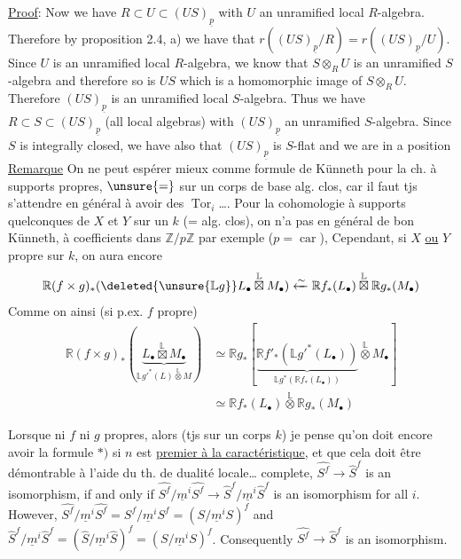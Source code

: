\uline{Proof}: Now we have $R\subset U\subset(US)_{\underline p}$ with $U$ an unramified local $R$-algebra.
Therefore by proposition 2.4, a) we have that $r((US)_{\underline p}/R)=r((US)_{\underline p}/U)$. Since
$U$ is an unramified local $R$-algebra, we know that $S\otimes_R U$ is an unramified
$S$-algebra and therefore so is $US$ which is a homomorphic image of $S\otimes_R U$.
Therefore $(US)_{\underline p}$ is an unramified local $S$-algebra. Thus we have $R\subset S\subset(US)_{\underline p}$
(all local algebras) with $(US)_{\underline p}$ an unramified $S$-algebra. Since $S$ is
integrally closed, we have also that $(US)_{\underline p}$ is $S$-flat and we are in a position
\uline{Remarque} On ne peut espérer mieux comme
formule de Künneth pour la ch. à supports
propres, $\unsure{=}$ sur un corps de base alg. clos, car
il faut tjs s'attendre en général à avoir des
$\operatorname{Tor}_i$\ldots. Pour la cohomologie à supports quelconques
de $X$ et $Y$  sur un $k$ (= alg. clos), on n'a pas
en général de bon Künneth, à coefficients dans
$\mathbb Z/p\mathbb Z$ par exemple ($p=\operatorname{car}$), 
Cependant, si $X$ \uline{ou}
\uline{$Y$} propre sur $k$, on aura encore
\margin{\textcircled{*}}
\[
\mathbb R(f\times g)_*(\deleted{\unsure{\mathbb Lg}}L_\bullet\overset{\mathbb L}{\boxtimes}M_\bullet)
\xleftarrow{\sim}\mathbb Rf_*(L_\bullet)\overset{\mathbb L}{\boxtimes}\mathbb Rg_*(M_\bullet)
\]
Comme on  ainsi (si p.ex. $f$ propre)
\[
\begin{aligned}
\mathbb R(f\times g)_*(\underbrace{L_\bullet\overset{\mathbb L}{\boxtimes}M_\bullet}_{\mathbb Lg'^*(L)\overset{\mathbb L}{\otimes}M})
&\simeq\mathbb Rg_*[\underbrace{\mathbb Rf'_*(\mathbb Lg'^*(L_\bullet))}_{\mathbb Lg^*(\mathbb Rf_*(L_\bullet))}\overset{\mathbb L}{\otimes}M_\bullet]\\
&\simeq\mathbb Rf_*(L_\bullet)\overset{\mathbb L}{\otimes}\mathbb Rg_*(M_\bullet)
\end{aligned}
\]

Lorsque ni $f$ ni $g$ propres, alors  (tjs sur
un corps $k$) je pense qu'on doit encore avoir
la formule  $*)$ si $n$ est \uline{premier à la caractéristique},
et que cela doit être démontrable à l'aide du
th. de dualité locale\ldots
{}
complete, $\widehat{S^f}\longrightarrow\widehat S^f$ is an isomorphism, if and only if $\widehat{S^f}/\underline m^i\widehat{S^f}\longrightarrow
\widehat S^f/\underline m^i\widehat S^f$ is an isomorphism for all $i$. However, $\widehat{S^f}/\underline m^i\widehat{S^f}=S^f/\underline m^iS^f=
(S/\underline m^iS)^f$ and $\widehat S^f/\underline m^i\widehat S^f=(\widehat S/\underline m^i\widehat S)^f=(S/\underline m^iS)^f$. Consequently $\widehat{S^f}\longrightarrow\widehat S^f$ is
an isomorphism.

